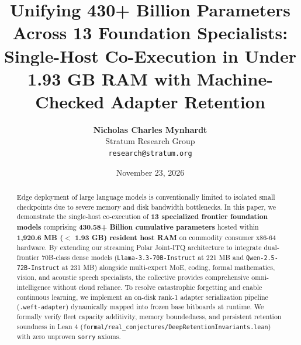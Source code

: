 \documentclass[11pt,a4paper]{article}
\title{\textbf{Unifying 430+ Billion Parameters Across 13 Foundation Specialists: Single-Host Co-Execution in Under 1.93 GB RAM with Machine-Checked Adapter Retention}}
\author{\textbf{Nicholas Charles Mynhardt} \\
Stratum Research Group \\
\texttt{research@stratum.org}}
\date{November 23, 2026}
\begin{document}
\maketitle

\begin{abstract}
Edge deployment of large language models is conventionally limited to isolated small checkpoints due to severe memory and disk bandwidth bottlenecks. In this paper, we demonstrate the single-host co-execution of \textbf{13 specialized frontier foundation models} comprising \textbf{430.58+ Billion cumulative parameters} hosted within \textbf{1,920.6 MB ($<$ 1.93 GB) resident host RAM} on commodity consumer x86-64 hardware. By extending our streaming Polar Joint-ITQ architecture to integrate dual-frontier 70B-class dense models (\texttt{Llama-3.3-70B-Instruct} at 221 MB and \texttt{Qwen-2.5-72B-Instruct} at 231 MB) alongside multi-expert MoE, coding, formal mathematics, vision, and acoustic speech specialists, the collective provides comprehensive omni-intelligence without cloud reliance. To resolve catastrophic forgetting and enable continuous learning, we implement an on-disk rank-1 adapter serialization pipeline (\texttt{.weft-adapter}) dynamically mapped into frozen base bitboards at runtime. We formally verify fleet capacity additivity, memory boundedness, and persistent retention soundness in Lean 4 (\texttt{formal/real\_conjectures/DeepRetentionInvariants.lean}) with zero unproven \texttt{sorry} axioms.
\end{abstract}
\end{document}
